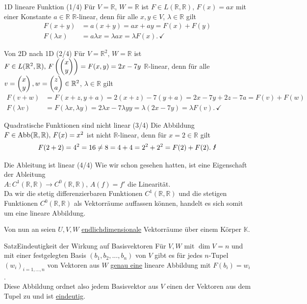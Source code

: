 \begin{Beispiel}
{1D lineare Funktion (1/4)}
Für $V=\mathbb{R}$, $W=\mathbb{R}$ ist $F\in L(\mathbb{R},\mathbb{R}),\,F(x)=ax$ mit einer Konstante $a\in\mathbb{R}$ $\mathbb{R}$-linear, denn für alle $x,y\in V$, $\lambda\in\mathbb{R}$ gilt
\begin{align*}
    F(x+y)&=a(x+y)=ax+ay=F(x)+F(y)\\
    F(\lambda x)&=a\lambda x=\lambda ax=\lambda F(x).\, \checkmark
\end{align*}
\end{Beispiel}
\begin{Beispiel}
{Von 2D nach 1D (2/4)}
Für $V=\mathbb{R}^2$, $W=\mathbb{R}$ ist $F\in L(\mathbb{R}^2,\mathbb{R}),\,F\left({\begin{pmatrix}x\\y\end{pmatrix}}\right)=F(x,y)=2x-7y$ $\mathbb{R}$-linear, denn für alle $v=\begin{pmatrix}x\\y\end{pmatrix},w=\begin{pmatrix}z\\a\end{pmatrix}\in \mathbb{R}^2$, $\lambda\in\mathbb{R}$ gilt
\begin{align*}
    F(v+w)&=F(x+z, y+a)=2(x+z)-7(y+a)=2x-7y+2z-7a=F(v)+F(w)\\
    F(\lambda v)&=F(\lambda x,\lambda y)=2\lambda x-7\lambda y y=\lambda(2x-7y)=\lambda F(v).\, \checkmark
\end{align*}
\end{Beispiel}
\begin{Beispiel}
{Quadratische Funktionen sind nicht linear (3/4)}
Die Abbildung $F\in\text{Abb}(\mathbb{R},\mathbb{R}),\,F(x)=x^2$ ist nicht $\mathbb{R}$-linear, denn für $x=2\in\mathbb{R}$ gilt
\begin{align*}
    F(2+2)=4^2=16\neq 8=4+4=2^2+2^2=F(2)+F(2).\text{ \Lightning}
\end{align*}
\end{Beispiel}
\begin{Beispiel}
{Die Ableitung ist linear (4/4)}
Wie wir schon gesehen hatten, ist eine Eigenschaft der Ableitung\\
$A:C^1(\mathbb{R},\mathbb{R})\to C^0(\mathbb{R},\mathbb{R}),\, A(f)=f'$ die Linearität.\\
Da wir die stetig differenzierbaren Funktionen $C^1(\mathbb{R},\mathbb{R})$ und die stetigen Funktionen $C^0(\mathbb{R},\mathbb{R})$ als Vektorräume auffassen können, handelt es sich somit um eine lineare Abbildung.
\end{Beispiel}
Von nun an seien $U,V,W$ \underline{endlichdimensionale} Vektorräume über einem Körper $\mathbb{K}$. 
\begin{Satz}
{Satz}{Eindeutigkeit der Wirkung auf Basisvektoren}
Für $V,W$ mit $\dim V=n$ und mit einer festgelegten Basis $(b_1,b_2,...,b_n)$ von $V$ gibt es für jedes $n$-Tupel $(w_i)_{i=1,...,n}$ von Vektoren aus $W$ \underline{genau eine} lineare Abbildung mit $F(b_i)=w_i$.\\
Diese Abbildung ordnet also jedem Basisvektor aus $V$ einen der Vektoren aus dem Tupel zu und ist \underline{eindeutig}.
\end{Satz}
